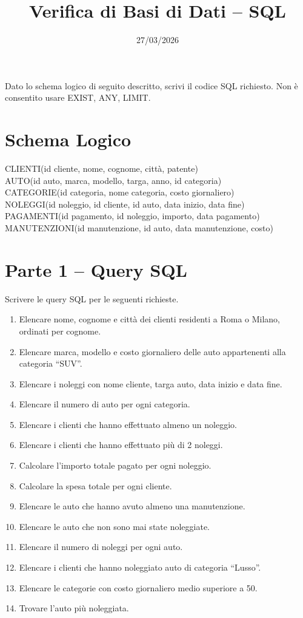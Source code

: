 \documentclass[a4paper,12pt]{article}
\begin{document}
\title{Verifica di Basi di Dati – SQL}
\date{27/03/2026}
\maketitle

Dato lo schema logico di seguito descritto, scrivi il codice SQL richiesto. Non è consentito usare EXIST, ANY, LIMIT.

\section*{Schema Logico}
CLIENTI(id cliente, nome, cognome, città, patente)\\
AUTO(id auto, marca, modello, targa, anno, id categoria)\\
CATEGORIE(id categoria, nome categoria, costo giornaliero)\\
NOLEGGI(id noleggio, id cliente, id auto, data inizio, data fine)\\
PAGAMENTI(id pagamento, id noleggio, importo, data pagamento)\\
MANUTENZIONI(id manutenzione, id auto, data manutenzione, costo)

\section*{Parte 1 – Query SQL}
Scrivere le query SQL per le seguenti richieste.
\begin{enumerate}
\item Elencare nome, cognome e città dei clienti residenti a Roma o Milano, ordinati per cognome.
\item Elencare marca, modello e costo giornaliero delle auto appartenenti alla categoria “SUV”.
\item Elencare i noleggi con nome cliente, targa auto, data inizio e data fine.
\item Elencare il numero di auto per ogni categoria.
\item Elencare i clienti che hanno effettuato almeno un noleggio.
\item Elencare i clienti che hanno effettuato più di 2 noleggi.
\item Calcolare l’importo totale pagato per ogni noleggio.
\item Calcolare la spesa totale per ogni cliente.
\item Elencare le auto che hanno avuto almeno una manutenzione.
\item Elencare le auto che non sono mai state noleggiate.
\item Elencare il numero di noleggi per ogni auto.
\item Elencare i clienti che hanno noleggiato auto di categoria “Lusso”.
\item Elencare le categorie con costo giornaliero medio superiore a 50.
\item Trovare l’auto più noleggiata.
\end{enumerate}
\end{document}

